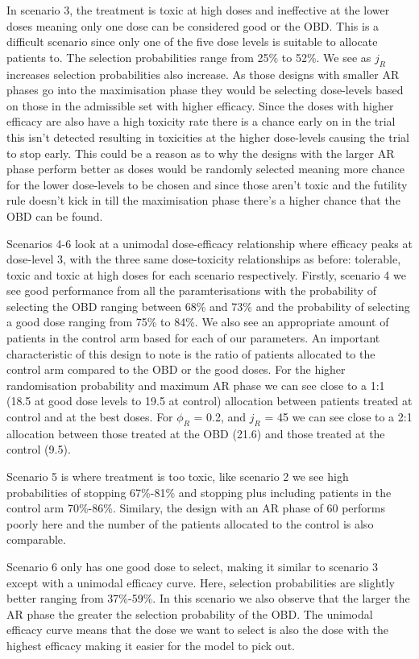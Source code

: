 In scenario 3, the treatment is toxic at high doses and ineffective at the lower doses meaning only one dose can be considered good or the OBD. This is a difficult scenario since only one of the five dose levels is suitable to allocate patients to. The selection probabilities range from 25\% to 52\%. We see as $j_R$ increases selection probabilities also increase. As those designs with smaller AR phases go into the maximisation phase they would be selecting dose-levels based on those in the admissible set with higher efficacy. Since the doses with higher efficacy are also have a high toxicity rate there is a chance early on in the trial this isn't detected resulting in toxicities at the higher dose-levels causing the trial to stop early. This could be a reason as to why the designs with the larger AR phase perform better as doses would be randomly selected meaning more chance for the lower dose-levels to be chosen and since those aren't toxic and the futility rule doesn't kick in till the maximisation phase there's a higher chance that the OBD can be found.

Scenarios 4-6 look at a unimodal dose-efficacy relationship where efficacy peaks at dose-level 3, with the three same dose-toxicity relationships as before: tolerable, toxic and toxic at high doses for each scenario respectively. Firstly, scenario 4 we see good performance from all the paramterisations with the probability of selecting the OBD ranging between 68\% and 73\% and the probability of selecting a good dose ranging from 75\% to 84\%. We also see an appropriate amount of patients in the control arm based for each of our parameters. An important characteristic of this design to note is the ratio of patients allocated to the control arm compared to the OBD or the good doses. For the higher randomisation probability and maximum AR phase we can see close to a  1:1 (18.5 at good dose levels to 19.5 at control) allocation between patients treated at control and at the best doses. For $\phi_R$ = 0.2, and $j_R$ = 45 we can see close to a 2:1 allocation between those treated at the OBD (21.6) and those treated at the control (9.5). 

Scenario 5 is where treatment is too toxic, like scenario 2 we see high probabilities of stopping 67\%-81\% and stopping plus including patients in the control arm 70\%-86\%. Similary, the design with an AR phase of 60 performs poorly here and the number of the patients allocated to the control is also comparable. 

Scenario 6 only has one good dose to select, making it similar to scenario 3 except with a unimodal efficacy curve. Here, selection probabilities are slightly better ranging from 37\%-59\%. In this scenario we also observe that the larger the AR phase the greater the selection probability of the OBD. The unimodal efficacy curve means that the dose we want to select is also the dose with the highest efficacy making it easier for the model to pick out. 

